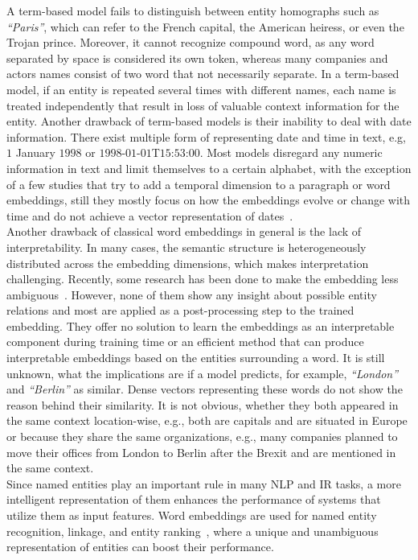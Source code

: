 A term-based model fails to distinguish between entity homographs such as  \emph{``Paris''},  which can refer to the French capital, the American heiress, or even the Trojan prince. Moreover, it cannot recognize compound word, as any word separated by space is considered its own token, whereas many companies and actors names consist of two word that not necessarily separate.  In a term-based model, if an entity is repeated several times with different names, each name is treated independently that result in loss of valuable context information for the entity. Another drawback of term-based models is their inability to deal with date information. There exist multiple form of representing date and time in text, e.g, $1$ January $1998$ or $1998$-$01$-$01$T$15$:$53$:$00$. Most models disregard any numeric information in text and limit themselves to a certain alphabet, with the exception of a few studies that try to add a temporal dimension to a paragraph or word embeddings, still they mostly focus on how the embeddings evolve or change with time and do not achieve a vector representation of dates~.  \\
Another drawback of classical word embeddings in general is the lack of interpretability. In many cases, the semantic structure is heterogeneously distributed across the embedding dimensions, which makes interpretation challenging. Recently, some research has been done to make the embedding less ambiguous~. However, none of them show any insight about possible entity relations and most are applied as a post-processing step to the trained embedding. They offer no solution to learn the embeddings as an interpretable component during training time or an efficient method that can produce interpretable embeddings based on the entities surrounding a word. It is still unknown, what the implications are if a model predicts, for example,  \emph{``London''} and \emph{``Berlin''} as similar. Dense vectors representing these words do not show the reason behind their similarity. It is not obvious, whether they both appeared in the same context location-wise, e.g., both are capitals and are situated in Europe or because they share the same organizations, e.g., many companies planned to move their offices from London to Berlin after the Brexit and are mentioned in the same context. \\
Since named entities play an important rule in many NLP and IR tasks, a more intelligent representation of them enhances the performance of systems that utilize them as input features. Word embeddings are used for named entity recognition, linkage, and entity ranking~, where a unique and unambiguous representation of entities can boost their performance.
